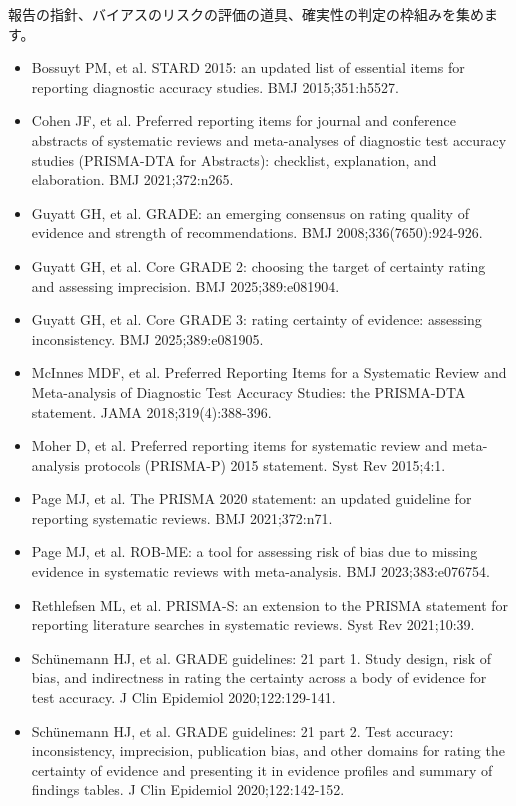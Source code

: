報告の指針、バイアスのリスクの評価の道具、確実性の判定の枠組みを集めます。

\begin{itemize}
\item Bossuyt PM, et al. STARD 2015: an updated list of essential items for reporting diagnostic accuracy studies. BMJ 2015;351:h5527.
\item Cohen JF, et al. Preferred reporting items for journal and conference abstracts of systematic reviews and meta-analyses of diagnostic test accuracy studies (PRISMA-DTA for Abstracts): checklist, explanation, and elaboration. BMJ 2021;372:n265.
\item Guyatt GH, et al. GRADE: an emerging consensus on rating quality of evidence and strength of recommendations. BMJ 2008;336(7650):924-926.
\item Guyatt GH, et al. Core GRADE 2: choosing the target of certainty rating and assessing imprecision. BMJ 2025;389:e081904.
\item Guyatt GH, et al. Core GRADE 3: rating certainty of evidence: assessing inconsistency. BMJ 2025;389:e081905.
\item McInnes MDF, et al. Preferred Reporting Items for a Systematic Review and Meta-analysis of Diagnostic Test Accuracy Studies: the PRISMA-DTA statement. JAMA 2018;319(4):388-396.
\item Moher D, et al. Preferred reporting items for systematic review and meta-analysis protocols (PRISMA-P) 2015 statement. Syst Rev 2015;4:1.
\item Page MJ, et al. The PRISMA 2020 statement: an updated guideline for reporting systematic reviews. BMJ 2021;372:n71.
\item Page MJ, et al. ROB-ME: a tool for assessing risk of bias due to missing evidence in systematic reviews with meta-analysis. BMJ 2023;383:e076754.
\item Rethlefsen ML, et al. PRISMA-S: an extension to the PRISMA statement for reporting literature searches in systematic reviews. Syst Rev 2021;10:39.
\item Schünemann HJ, et al. GRADE guidelines: 21 part 1. Study design, risk of bias, and indirectness in rating the certainty across a body of evidence for test accuracy. J Clin Epidemiol 2020;122:129-141.
\item Schünemann HJ, et al. GRADE guidelines: 21 part 2. Test accuracy: inconsistency, imprecision, publication bias, and other domains for rating the certainty of evidence and presenting it in evidence profiles and summary of findings tables. J Clin Epidemiol 2020;122:142-152.

\end{itemize}
